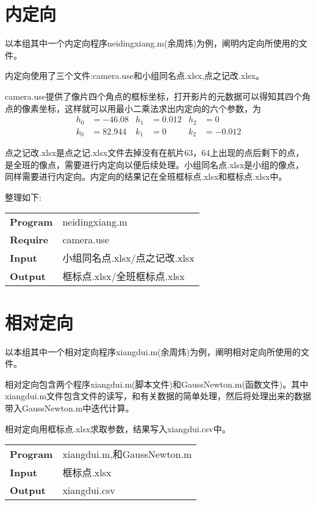 \section{内定向}

以本组其中一个内定向程序neidingxiang.m(余周炜)为例，阐明内定向所使用的文件。

内定向使用了三个文件:camera.use和小组同名点.xlsx,点之记改.xlsx。

camera.use提供了像片四个角点的框标坐标，打开影片的元数据可以得知其四个角点的像素坐标，这样就可以用最小二乘法求出内定向的六个参数，为
\begin{align}
h_0&=-46.08 &h_1&=0.012 &h_2&=0 \\
k_0&=82.944 &k_1&=0 &k_2&=-0.012
\end{align}

点之记改.xlsx是点之记.xlsx文件去掉没有在航片63，64上出现的点后剩下的点，是全班的像点，需要进行内定向以便后续处理。小组同名点.xlsx是小组的像点，同样需要进行内定向。内定向的结果记在全班框标点.xlsx和框标点.xlsx中。

整理如下:
\begin{table}
\begin{tabular}{p{10em}p{8cm}}
\toprule
\textbf{Program} & neidingxiang.m \\
\textbf{Require} & camera.use \\
\textbf{Input} & 小组同名点.xlsx/点之记改.xlsx \\
\textbf{Output} & 框标点.xlsx/全班框标点.xlsx \\
\bottomrule
\end{tabular}
\end{table}
\section{相对定向}

以本组其中一个相对定向程序xiangdui.m(余周炜)为例，阐明相对定向所使用的文件。

相对定向包含两个程序xiangdui.m(脚本文件)和GaussNewton.m(函数文件)。其中xiangdui.m文件包含文件的读写，和有关数据的简单处理，然后将处理出来的数据带入GaussNewton.m中迭代计算。

相对定向用框标点.xlsx求取参数，结果写入xiangdui.csv中。
\begin{table}[htbp]
\begin{tabular}{p{10em}p{8cm}}
\toprule
\textbf{Program} & xiangdui.m,和GaussNewton.m \\
\textbf{Input} & 框标点.xlsx \\
\textbf{Output} & xiangdui.csv \\
\bottomrule
\end{tabular}
\end{table}

